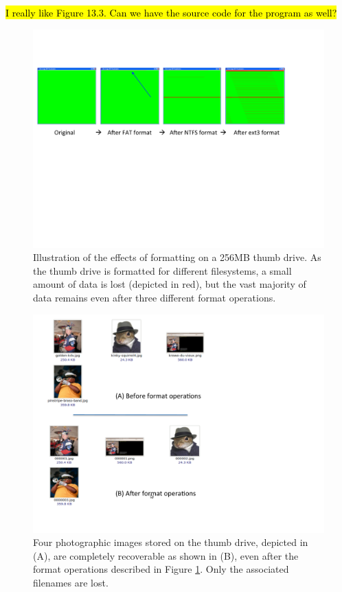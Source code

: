 \hl{I really like Figure 13.3. Can we have the source code for the
  program as well?}
\begin{figure}[ht]
\centering
\includegraphics[width=150mm]{ch-carving/formatting.pdf}
\caption{Illustration of the effects of formatting on a 256MB thumb drive.  As the thumb drive is formatted for different filesystems, a small amount of data is lost (depicted in red), but the vast majority of data remains even after three different format operations.}
\label{fig:formatting}
\end{figure}


\begin{figure}[ht]
\centering
\includegraphics[width=150mm]{ch-carving/recovered.pdf}
\caption{Four photographic images stored on the thumb drive, depicted in (A), are completely recoverable as shown in (B), even after the format operations described in Figure \ref{fig:formatting}.  Only the associated filenames are lost.}
\label{fig:recovered}
\end{figure}


